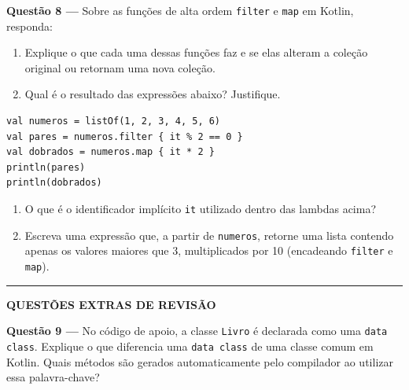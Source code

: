 \documentclass[12pt,a4paper]{article}
\newcommand{\resposta}[1]{
\noindent
\framebox[\textwidth]{
\begin{minipage}{0.98\textwidth}
\vspace*{#1}\null
\end{minipage}
}
}
\begin{document}
\vspace{0.3cm}
\resposta{7cm}

\vspace{0.5cm}

\textbf{Questão 8 —} Sobre as funções de alta ordem \texttt{filter} e \texttt{map} em Kotlin, responda:

\begin{enumerate}[label=\alph*)]
    \item Explique o que cada uma dessas funções faz e se elas alteram a coleção original ou retornam uma nova coleção.
    \item Qual é o resultado das expressões abaixo? Justifique.
\end{enumerate}

\begin{lstlisting}[basicstyle=\small\ttfamily, breaklines=true]
val numeros = listOf(1, 2, 3, 4, 5, 6)
val pares = numeros.filter { it % 2 == 0 }
val dobrados = numeros.map { it * 2 }
println(pares)
println(dobrados)
\end{lstlisting}

\begin{enumerate}[label=\alph*), resume]
    \item O que é o identificador implícito \texttt{it} utilizado dentro das lambdas acima?
    \item Escreva uma expressão que, a partir de \texttt{numeros}, retorne uma lista contendo apenas os valores maiores que 3, multiplicados por 10 (encadeando \texttt{filter} e \texttt{map}).
\end{enumerate}

\vspace{0.3cm}
\resposta{7cm}

\vspace{0.5cm}

\hrule
\vspace{0.3cm}
\begin{center}
    \textbf{QUESTÕES EXTRAS DE REVISÃO}
\end{center}
\vspace{0.3cm}

\textbf{Questão 9 —} No código de apoio, a classe \texttt{Livro} é declarada como uma \texttt{data class}. Explique o que diferencia uma \texttt{data class} de uma classe comum em Kotlin. Quais métodos são gerados automaticamente pelo compilador ao utilizar essa palavra-chave?
\end{document}
